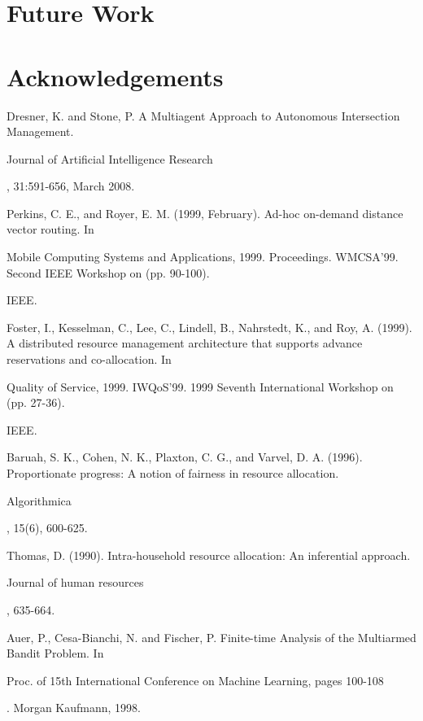 \documentclass[conference]{IEEEtran}
\begin{document}
\section{Future Work}


\section{Acknowledgements}

\begin{thebibliography}{1}
Dresner, K. and Stone, P. A Multiagent Approach to Autonomous Intersection Management. \begin{em}Journal of Artificial Intelligence Research\end{em}, 31:591-656, March 2008.

Perkins, C. E., and Royer, E. M. (1999, February). Ad-hoc on-demand distance vector routing. In \begin{em}Mobile Computing Systems and Applications, 1999. Proceedings. WMCSA'99. Second IEEE Workshop on (pp. 90-100).\end{em} IEEE.

Foster, I., Kesselman, C., Lee, C., Lindell, B., Nahrstedt, K., and Roy, A. (1999). A distributed resource management architecture that supports advance reservations and co-allocation. In \begin{em}Quality of Service, 1999. IWQoS'99. 1999 Seventh International Workshop on (pp. 27-36).\end{em} IEEE.

Baruah, S. K., Cohen, N. K., Plaxton, C. G., and Varvel, D. A. (1996). Proportionate progress: A notion of fairness in resource allocation. \begin{em}Algorithmica\end{em}, 15(6), 600-625.

Thomas, D. (1990). Intra-household resource allocation: An inferential approach. \begin{em}Journal of human resources\end{em}, 635-664.

Auer, P., Cesa-Bianchi, N. and Fischer, P. Finite-time Analysis of the Multiarmed Bandit Problem. In \begin{em} Proc. of 15th International Conference on Machine Learning, pages 100-108\end{em}. Morgan Kaufmann, 1998.


\end{thebibliography}
\end{document}
